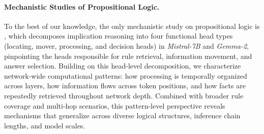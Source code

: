 \documentclass[11pt]{article}
\begin{document}


\paragraph{Mechanistic Studies of Propositional Logic.}
%
To the best of our knowledge, the only mechanistic study on propositional logic is \citet{aimpliesb}, which decomposes implication reasoning into four functional head types (locating, mover, processing, and decision heads) in \textit{Mistral-7B} and \textit{Gemma-2}, pinpointing the heads responsible for rule retrieval, information movement, and answer selection. Building on this head-level decomposition, we characterize network-wide computational patterns: how processing is temporally organized across layers, how information flows across token positions, and how facts are repeatedly retrieved throughout network depth. Combined with broader rule coverage and multi-hop scenarios, this pattern-level perspective reveals mechanisms that generalize across diverse logical structures, inference chain lengths, and model scales.
\end{document}
